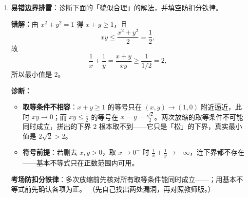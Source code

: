 \begin{tcolorbox}
\begin{enumerate}[label=(\arabic*), itemsep=4pt]
\begin{advancedonly}
设 $\dfrac{x^2}{a^2}+\dfrac{y^2}{b^2}=1\ (a,b>0)$，求 $T=\dfrac1x+\dfrac1y$ 的最小值。伸缩 $X=\dfrac xa,\ Y=\dfrac yb$，则 $X^2+Y^2=1$，目标化为 $\dfrac1a\dfrac1X+\dfrac1b\dfrac1Y$。仍平方乘「1」，令 $t=\dfrac YX$：
\[
T^2=\frac{(1+t^2)(bt+a)^2}{a^2b^2t^2}.
\]
再令 $w=\dfrac ba t$（把系数吸收进比例），得
\[
T^2=h(w)=\frac{(w+1)^2}{b^2}+\frac{\left(1+\frac1w\right)^2}{a^2},
\qquad
h'(w)=\frac{2(w+1)(a^2w^3-b^2)}{a^2b^2w^3}.
\]
令 $h'(w)=0$ 得 $w^3=\dfrac{b^2}{a^2}$，代回即得
\[
T_{\min}=\tk{\frac{(a^{2/3}+b^{2/3})^{3/2}}{ab}},\qquad
\text{取等比例 }\ \tk{\frac yx=\left(\frac ba\right)^{2/3}}.
\]
检验：$a=b=1$ 回到 $2\sqrt2$；$a=2,b=1$ 时 $T_{\min}\approx2.081$，对应 $\dfrac yx\approx0.630$。结构不变、取等位置随 $a:b$ 改变——配平负责降维，比例负责定位。
\end{advancedonly}

\item \textbf{易错边界排雷}：诊断下面的「貌似合理」的解法，并填空防扣分铁律。

{\bfseries\color{red!70!black}错解：}由 $x^2+y^2=1$ 得 $x+y\ge1$，且
\[
xy\le\frac{x^2+y^2}{2}=\frac12,
\]
故
\[
\frac1x+\frac1y=\frac{x+y}{xy}\ge\frac{1}{1/2}=2,
\]
所以最小值是 $2$。

\ifteacher
{\bfseries\color{main}诊断：}
\begin{itemize}[itemsep=1pt]
\item \textbf{取等条件不相容}：$x+y\ge1$ 的等号只在 $(x,y)\to(1,0)$ 附近逼近，此时 $xy\to0$；而 $xy\le\frac12$ 的等号在 $x=y=\frac{\sqrt2}{2}$。两次放缩的取等条件不可能同时成立，拼出的下界 $2$ 根本取不到——它只是「松」的下界，真实最小值是 $2\sqrt2>2$。
\item \textbf{符号前提}：若删去 $x,y>0$，取 $x\to0^-$ 时 $\frac1x+\frac1y\to-\infty$，连下界都不存在——基本不等式只在正数范围内可用。
\end{itemize}

\textbf{考场防扣分铁律}：多次放缩前先核对所有取等条件能同时成立——；用基本不等式前先确认各项为正。
\else
{\small（先自己找出两处漏洞，再对照教师版。）}
\fi
{}
\end{enumerate}
\end{tcolorbox}


